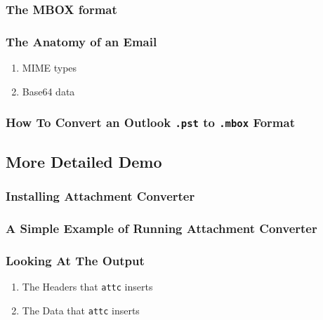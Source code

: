 \documentclass[11pt]{article}
\begin{document}
\subsubsection{The MBOX format}
\label{sec:orgce1370f}

\subsubsection{The Anatomy of an Email}
\label{sec:org094906b}

\begin{enumerate}
\item MIME types
\label{sec:orgf841415}

\item Base64 data
\label{sec:orgd260f87}
\end{enumerate}

\subsubsection{How To Convert an Outlook \texttt{.pst} to \texttt{.mbox} Format}
\label{sec:org64cd4e8}

\subsection{More Detailed Demo}
\label{sec:org7d773ef}

\subsubsection{Installing Attachment Converter}
\label{sec:orgb9428a3}

\subsubsection{A Simple Example of Running Attachment Converter}
\label{sec:orgaa3bb83}

\subsubsection{Looking At The Output}
\label{sec:orge58139d}

\begin{enumerate}
\item The Headers that \texttt{attc} inserts
\label{sec:org4021f5f}

\item The Data that \texttt{attc} inserts
\label{sec:orge5350fa}
\end{enumerate}
\end{document}
